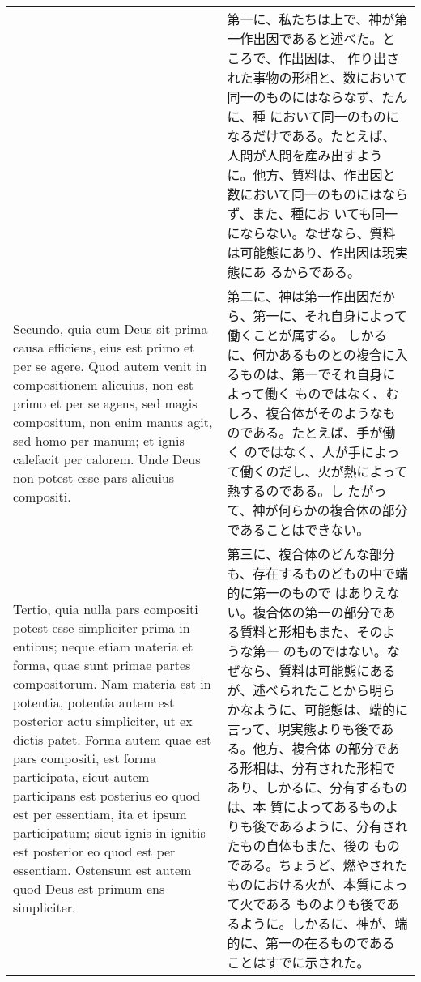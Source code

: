 \documentclass[10pt]{jsarticle}
\begin{document}
\begin{longtable}{p{21em}p{21em}}
&

第一に、私たちは上で、神が第一作出因であると述べた。ところで、作出因は、
作り出された事物の形相と、数において同一のものにはならなず、たんに、種
において同一のものになるだけである。たとえば、人間が人間を産み出すよう
に。他方、質料は、作出因と数において同一のものにはならず、また、種にお
いても同一にならない。なぜなら、質料は可能態にあり、作出因は現実態にあ
るからである。

\\


Secundo, quia cum Deus sit prima causa efficiens, eius est primo et
per se agere. Quod autem venit in compositionem alicuius, non est
primo et per se agens, sed magis compositum, non enim manus agit, sed
homo per manum; et ignis calefacit per calorem. Unde Deus non potest
esse pars alicuius compositi.

&

第二に、神は第一作出因だから、第一に、それ自身によって働くことが属する。
しかるに、何かあるものとの複合に入るものは、第一でそれ自身によって働く
ものではなく、むしろ、複合体がそのようなものである。たとえば、手が働く
のではなく、人が手によって働くのだし、火が熱によって熱するのである。し
たがって、神が何らかの複合体の部分であることはできない。

\\

Tertio, quia nulla pars compositi potest esse simpliciter prima in
entibus; neque etiam materia et forma, quae sunt primae partes
compositorum. Nam materia est in potentia, potentia autem est
posterior actu simpliciter, ut ex dictis patet. Forma autem quae est
pars compositi, est forma participata, sicut autem participans est
posterius eo quod est per essentiam, ita et ipsum participatum; sicut
ignis in ignitis est posterior eo quod est per essentiam. Ostensum est
autem quod Deus est primum ens simpliciter.

&

第三に、複合体のどんな部分も、存在するものどもの中で端的に第一のもので
はありえない。複合体の第一の部分である質料と形相もまた、そのような第一
のものではない。なぜなら、質料は可能態にあるが、述べられたことから明ら
かなように、可能態は、端的に言って、現実態よりも後である。他方、複合体
の部分である形相は、分有された形相であり、しかるに、分有するものは、本
質によってあるものよりも後であるように、分有されたもの自体もまた、後の
ものである。ちょうど、燃やされたものにおける火が、本質によって火である
ものよりも後であるように。しかるに、神が、端的に、第一の在るものである
ことはすでに示された。


\end{longtable}
\end{document}
